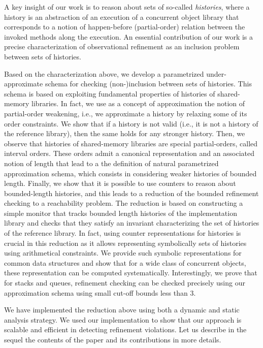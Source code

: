 A key insight of our work is to reason about sets of so-called {\em histories}, where a history is an abstraction of an execution of a concurrent object library that corresponds to a notion of happen-before (partial-order) relation between the invoked methods along the execution. An essential contribution of our work is a precise characterization of observational refinement as an inclusion problem between sets of histories.

Based on the characterization above, we develop a parametrized under-approximate schema for checking (non-)inclusion between sets of histories. This schema is based on  exploiting fundamental properties of histories of shared-memory libraries. 
In fact, we use as a concept of approximation the notion of partial-order weakening, i.e., we approximate a history by relaxing some of its order constraints. We show that if a history is not valid (i.e., it is not a history of the reference library), then the same holds for any stronger history. Then, we observe that histories of shared-memory libraries are special partial-orders, called interval orders. These orders admit a canonical representation and an associated notion of length that lead to a the definition of natural parametrized approximation schema, which consists in considering weaker histories of bounded length. Finally, we show that it is possible to use counters to reason about bounded-length histories, and this leads to a reduction of the bounded refinement checking to a reachability problem. The reduction is based on constructing a simple monitor that tracks bounded length histories of the implementation library and checks that they satisfy an invariant characterizing the set of histories of the reference library. In fact, using counter representations for histories is crucial in this reduction as it allows representing symbolically sets of histories using arithmetical constraints. We provide such  symbolic representations for common data structures and show that for a wide class of concurrent objects, these representation can be computed systematically. Interestingly, we prove that for stacks and queues, refinement checking can be checked precisely using our approximation schema using small cut-off bounds less than 3.

We have implemented the reduction above using both a dynamic and static analysis strategy. We used our implementation to show that our approach is scalable and efficient in detecting refinement violations. Let us describe in the sequel the contents of the paper and its contributions in more details. 

